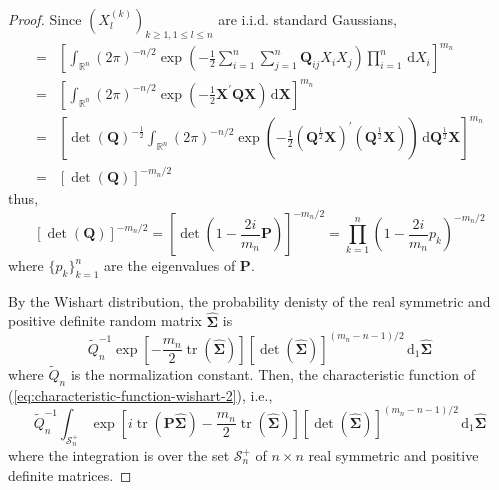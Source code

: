 \begin{proof}
    Since $\left(X_{l}^{(k)}\right)_{k\geq 1,1\leq l\leq n}$ are i.i.d. standard Gaussians,
    \begin{equation*}
        \begin{aligned}
            = & \left[\int_{\mathbb{R}^{n}}(2\pi)^{-n/2}\exp\left(-\frac{1}{2}\sum_{i=1}^{n}\sum_{j=1}^{n}\mathbf{Q}_{ij}X_{i}X_{j}\right)\prod_{i=1}^{n}\,\mathrm{d}X_{i}\right]^{m_{n}}                                                                                                                         \\
            = & \left[\int_{\mathbb{R}^{n}}(2\pi)^{-n/2}\exp\left(-\frac{1}{2}\mathbf{X}^{\prime}\mathbf{Q}\mathbf{X}\right)\,\mathrm{d}\mathbf{X}\right]^{m_{n}}                                                                                                                                                 \\
            = & \left[\operatorname{det}\left(\mathbf{Q}\right)^{-\frac{1}{2}}\int_{\mathbb{R}^{n}}(2\pi)^{-n/2}\exp\left(-\frac{1}{2}\left(\mathbf{Q}^{\frac{1}{2}}\mathbf{X}\right)^{\prime}\left(\mathbf{Q}^{\frac{1}{2}}\mathbf{X}\right)\right)\,\mathrm{d}\mathbf{Q}^{\frac{1}{2}}\mathbf{X}\right]^{m_{n}} \\
            = & \left[\operatorname{det}\left(\mathbf{Q}\right)\right]^{-m_{n}/2}
        \end{aligned}
    \end{equation*}
    thus,
    \begin{equation}
        \left[\operatorname{det}\left(\mathbf{Q}\right)\right]^{-m_{n}/2}=\left[\operatorname{det}\left(1-\frac{2i}{m_{n}}\mathbf{P}\right)\right]^{-m_{n}/2}=\prod_{k=1}^{n}\left(1-\frac{2i}{m_n}p_{k}\right)^{-m_{n}/2}
        \label{eq:characteristic-function-wishart-result-1}
    \end{equation}
    where $\{p_{k}\}_{k=1}^{n}$ are the eigenvalues of $\mathbf{P}$.

    By the Wishart distribution, the probability denisty of the real symmetric and positive definite random matrix $\widehat{\boldsymbol{\Sigma}}$ is
    \begin{equation}
        \widetilde{Q}_{n}^{-1}\exp\left[-\frac{m_{n}}{2}\operatorname{tr}\left(\widehat{\boldsymbol{\Sigma}}\right)\right]\left[\operatorname{det}\left(\widehat{\boldsymbol{\Sigma}}\right)\right]^{(m_{n}-n-1)/2}\,\mathrm{d}_{1}\widehat{\boldsymbol{\Sigma}}
        \label{eq:characteristic-function-wishart-2}
    \end{equation}
    where $\widetilde{Q}_{n}$ is the normalization constant. Then, the characteristic function of (\ref{eq:characteristic-function-wishart-2}), i.e.,
    \begin{equation}
        \widetilde{Q}_{n}^{-1}\int_{\mathcal{S}_{n}^{+}}\exp\left[i\operatorname{tr}\left(\mathbf{P}\widehat{\boldsymbol{\Sigma}}\right)-\frac{m_{n}}{2}\operatorname{tr}\left(\widehat{\boldsymbol{\Sigma}}\right)\right]\left[\operatorname{det}\left(\widehat{\boldsymbol{\Sigma}}\right)\right]^{(m_{n}-n-1)/2}\,\mathrm{d}_{1}\widehat{\boldsymbol{\Sigma}}
    \end{equation}
    where the integration is over the set $\mathcal{S}_{n}^{+}$ of $n\times n$ real symmetric and positive definite matrices.


\end{proof}
